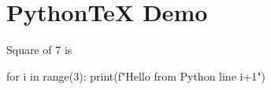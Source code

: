 \documentclass{article}
\begin{document}
\section*{PythonTeX Demo}

Square of 7 is 

\begin{pycode}
for i in range(3):
    print(f"Hello from Python line {i+1}")
\end{pycode}
\end{document}
